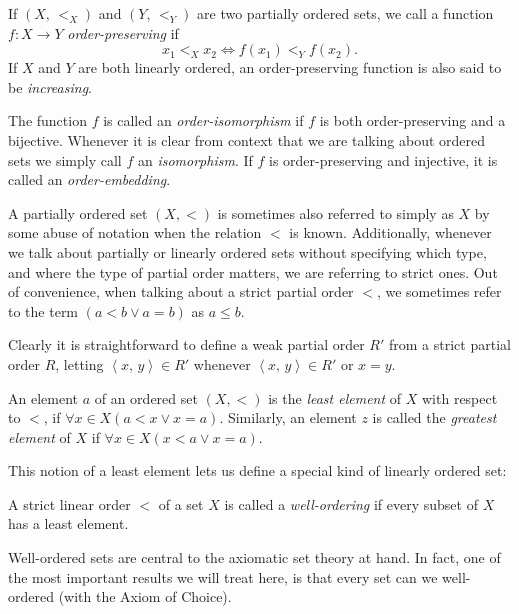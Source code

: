 \documentclass[../../main.tex]{subfiles}
\begin{document}
\begin{definition}\cite[p.13]{Jec78}
    If $\left(X,\, <_X\right)$ and $\left(Y,\, <_Y\right)$ are two partially ordered sets, we call a function $f: X \to Y$ \textit{order-preserving} if
    $$x_1 <_X x_2 \iff f(x_1) <_Y f(x_2).$$
    If $X$ and $Y$ are both linearly ordered, an order-preserving function is also said to be \textit{increasing}.

    The function $f$ is called an \textit{order-isomorphism} if $f$ is both order-preserving and a bijective.
    Whenever it is clear from context that we are talking about ordered sets we simply call $f$ an \textit{isomorphism}.
    If $f$ is order-preserving and injective, it is called an \textit{order-embedding}. \cite[p.167]{Gol17}
\end{definition}

A partially ordered set $(X, <)$ is sometimes also referred to simply as $X$ by some abuse of notation when the relation $<$ is known.
Additionally, whenever we talk about partially or linearly ordered sets without specifying which type, and where the type of partial order matters, we are referring to strict ones. \cite[p.12]{Jec78}
Out of convenience, when talking about a strict partial order $<$, we sometimes refer to the term $\left(a < b \vee a = b\right)$ as $a \leq b$.

Clearly it is straightforward to define a weak partial order $R'$ from a strict partial order $R$, letting $\left<x,\, y\right> \in R'$ whenever $\left<x,\, y\right> \in R'$ or $x = y$.

\begin{definition}\cite[p.12]{Jec78}
    An element $a$ of an ordered set $\left(X, <\right)$ is the \textit{least element} of $X$ with respect to $<$, if $\forall x \in X  \left(a < x \vee x = a\right)$.
    Similarly, an element $z$ is called the \textit{greatest element} of $X$ if $\forall x \in X  \left(x < a \vee x = a\right)$.
\end{definition}

This notion of a least element lets us define a special kind of linearly ordered set:
\begin{definition}\cite[p.13]{Jec78}
    A strict linear order $<$ of a set $X$ is called a \textit{well-ordering} if every subset of $X$ has a least element.
\end{definition}

Well-ordered sets are central to the axiomatic set theory at hand.
In fact, one of the most important results we will treat here, is that every set can we well-ordered (with the Axiom of Choice).
\end{document}
